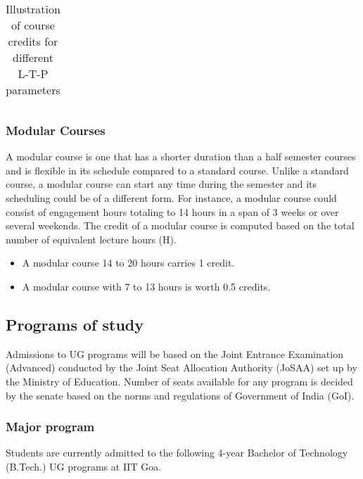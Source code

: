 \documentclass[a4paper, 12pt]{article}
\begin{document}
\begin{table}[!h]
	\centering
	
\begin{tabular}{|c|c|c|c|c|c|}
\end{tabular}

	\caption{ Illustration of course credits for different L-T-P parameters}
	
\end{table}

\subsubsection{Modular Courses}

A modular course is one that has a shorter duration than a half semester courses and is flexible in its schedule compared to a standard course. Unlike a standard course, a modular course can start any time during the semester and its scheduling could be of a different form. For instance, a modular course could consist of engagement hours totaling to 14 hours in a span of 3 weeks or over several weekends. The credit of a modular course is computed based on the total number of equivalent lecture hours (H). 

\begin{itemize}
	\item A modular course 14 to 20 hours carries 1 credit.
	\item A modular course with 7 to 13 hours is worth 0.5 credits.
\end{itemize}

\subsection{Programs of study}

Admissions to UG programs will be based on the Joint Entrance Examination (Advanced) conducted by the Joint Seat Allocation Authority (JoSAA) set up by the Ministry of Education. Number of seats available for any program is decided by the senate based on the norms and regulations of Government of India (GoI).

\subsubsection{Major program}

Students are currently admitted to the following 4-year Bachelor of Technology (B.Tech.) UG programs at IIT Goa.
\end{document}

